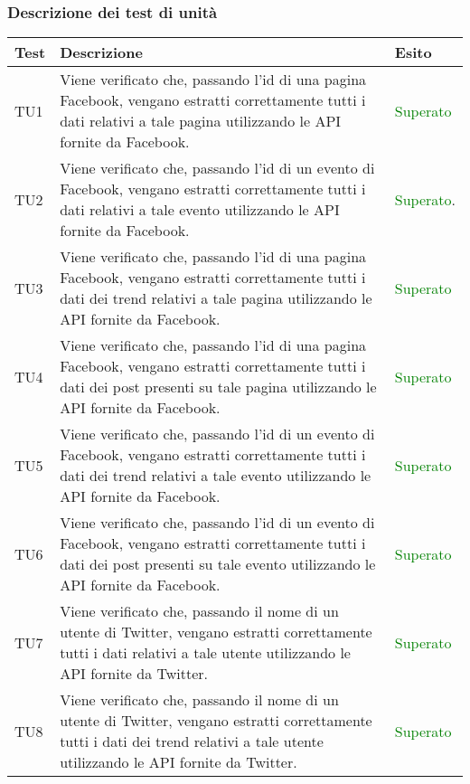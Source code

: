 		\subsubsection{Descrizione dei test di unità}
			\begin{center}

			\def\arraystretch{1.5}
			\bgroup
			\begin{longtable}{| p{2cm} | p{8cm} | p{2.5cm} |}
					\hline
					\textbf{Test} & \textbf{Descrizione} & \textbf{Esito}\\
					\hline						
					TU1 & Viene verificato che, passando l'id di una pagina Facebook, vengano estratti correttamente tutti i dati relativi a tale pagina utilizzando le API fornite da Facebook. & \textcolor{green}{Superato}\\
					\hline
					TU2 & Viene verificato che, passando l'id di un evento di Facebook, vengano estratti correttamente tutti i dati relativi a tale evento utilizzando le API fornite da Facebook. & \textcolor{green}{Superato}.\\
					\hline
					TU3 & Viene verificato che, passando l'id di una pagina Facebook, vengano estratti correttamente tutti i dati dei trend relativi a tale pagina utilizzando le API fornite da Facebook. & \textcolor{green}{Superato}\\
					\hline
					TU4 & Viene verificato che, passando l'id di una pagina Facebook, vengano estratti correttamente tutti i dati dei post presenti su tale pagina utilizzando le API fornite da Facebook. & \textcolor{green}{Superato}\\
					\hline
					TU5 & Viene verificato che, passando l'id di un evento di Facebook, vengano estratti correttamente tutti i dati dei trend relativi a tale evento utilizzando le API fornite da Facebook. & \textcolor{green}{Superato}\\
					\hline
					TU6 & Viene verificato che, passando l'id di un evento di Facebook, vengano estratti correttamente tutti i dati dei post presenti su tale evento utilizzando le API fornite da Facebook. & \textcolor{green}{Superato}\\
					\hline
					TU7 & Viene verificato che, passando il nome di un utente di Twitter, vengano estratti correttamente tutti i dati relativi a tale utente utilizzando le API fornite da Twitter. & \textcolor{green}{Superato}\\
					\hline
					TU8 & Viene verificato che, passando il nome di un utente di Twitter, vengano estratti correttamente tutti i dati dei trend relativi a tale utente utilizzando le API fornite da Twitter. & \textcolor{green}{Superato}\\

\end{longtable}
\end{center}
